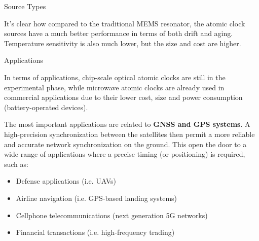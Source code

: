 \documentclass[10pt]{beamer}
\begin{document}
\begin{frame}[fragile]{Source Types}
\begin{table}
        \caption{Comparison of clock sources}

    \end{table}

    It's clear how compared to the traditional MEMS resonator, the atomic clock sources have a much better performance in terms of both drift and aging.
    Temperature sensitivity is also much lower, but the size and cost are higher.

\end{frame}



\begin{frame}{Applications}

    In terms of applications, chip-scale optical atomic clocks are still in the experimental phase, while microwave atomic clocks are already used in commercial applications due to their lower cost, size and power consumption (battery-operated devices).

    The most important applications are related to \textbf{GNSS and GPS systems}.
    A high-precision synchronization between the satellites then permit a more reliable and accurate network synchronization on the ground.
    This open the door to a wide range of applications where a precise timing (or positioning) is required, such as:

    \begin{itemize}
        \item Defense applications (i.e. UAVs)
        \item Airline navigation (i.e. GPS-based landing systems)
        \item Cellphone telecommunications (next generation 5G networks)
        \item Financial transactions (i.e. high-frequency trading)
    \end{itemize}

\end{frame}
\end{document}
